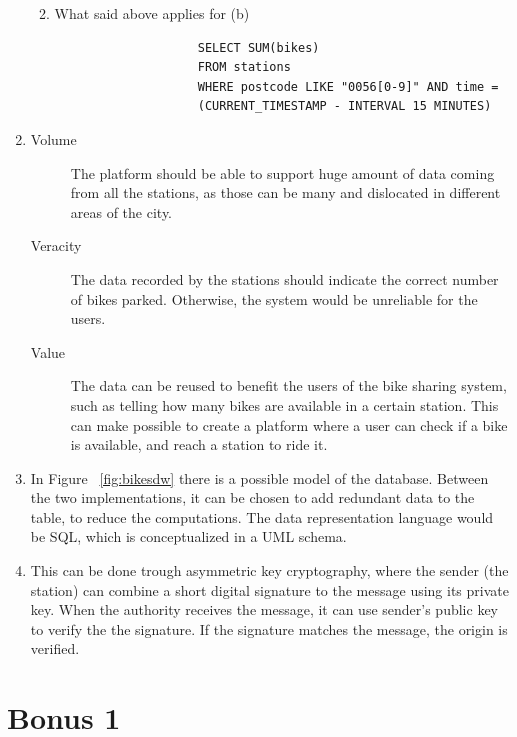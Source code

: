\documentclass[acmsmall, screen,timestamp,nonacm]{acmart}
\begin{document}
\begin{enumerate}
\begin{enumerate}
\begin{verbatim}
				\end{verbatim}
			\item What said above applies for (b)
				\begin{verbatim}
					SELECT SUM(bikes)
					FROM stations
					WHERE postcode LIKE "0056[0-9]" AND time =
					(CURRENT_TIMESTAMP - INTERVAL 15 MINUTES)
				\end{verbatim}
		\end{enumerate}
	\item 
		\begin{description}
			\item[Volume] The platform should be able to support huge amount of
				data coming from all the stations, as those can be many and
				dislocated in different areas of the city. 
			\item[Veracity] The data recorded by the stations should indicate
				the correct number of bikes parked. Otherwise, the system would
				be unreliable for the users.
			\item[Value] The data can be reused to benefit the users of the bike
				sharing system, such as telling how many bikes are available in
				a certain station. This can make possible to create a platform
				where a user can check if a bike is available, and reach a
				station to ride it. 
		\end{description}
	\item In Figure ~\ref{fig:bikesdw} there is a possible model of the
		database. Between the two implementations, it can be chosen to add
		redundant data to the table, to reduce the computations. The data
		representation language would be SQL, which is conceptualized in a
		UML schema.
	\item This can be done trough asymmetric key cryptography, where the
		sender (the station) can combine a short digital signature to the
		message using its private key. When the authority receives the message,
		it can use sender's public key to verify the the signature. If the
		signature matches the message, the origin is verified.
\end{enumerate}

\section{Bonus 1} %
\label{sec:bonus_1}
\end{document}
